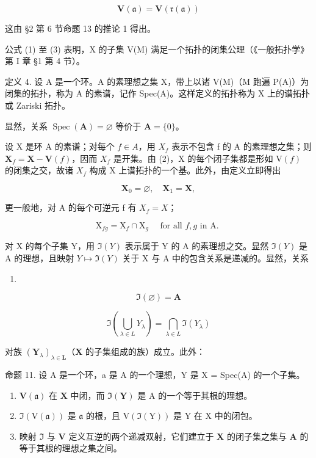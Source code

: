 \[
\mathbf {V} (\mathfrak {a}) = \mathbf {V} (\mathfrak {r} (\mathfrak {a}))\tag{4}
\]

这由 §2 第 6 节命题 13 的推论 1 得出。

公式 (1) 至 (3) 表明，X 的子集 V(M) 满足一个拓扑的闭集公理（《一般拓扑学》第 I 章 §1 第 4 节）。

定义 4. 设 A 是一个环。A 的素理想之集 X，带上以诸 V(M)（M 跑遍 P(A)）为闭集的拓扑，称为 A 的素谱，记作 Spec(A)。这样定义的拓扑称为 X 上的谱拓扑或 Zariski 拓扑。

显然，关系 \(\operatorname{Spec}(\mathbf{A}) = \varnothing\) 等价于 \(\mathbf{A} = \{0\}\)。

设 X 是环 A 的素谱；对每个 \(f \in A\)，用 \(X_{f}\) 表示不包含 f 的 A 的素理想之集；则 \(\mathbf{X}_{f} = \mathbf{X} - \mathbf{V}(f)\)，因而 \(X_{f}\) 是开集。由 (2)，X 的每个闭子集都是形如 \(\mathrm{V}(f)\) 的闭集之交，故诸 \(X_{f}\) 构成 X 上谱拓扑的一个基。此外，由定义立即得出

\[
\mathbf {X} _ {0} = \varnothing , \quad \mathbf {X} _ {1} = \mathbf {X},\tag{5}
\]

更一般地，对 A 的每个可逆元 f 有 \(X_{f} = X\)；

\[
\mathrm{X} _ {f g} = \mathrm{X} _ {f} \cap \mathrm{X} _ {g} \quad \text {   for   all   } f, g \text {   in   A.   }\tag{6}
\]

对 X 的每个子集 Y，用 \(\Im(Y)\) 表示属于 Y 的 A 的素理想之交。显然 \(\Im(Y)\) 是 A 的理想，且映射 \(Y \mapsto \Im(Y)\) 关于 X 与 A 中的包含关系是递减的。显然，关系

\begin{enumerate}
\def\labelenumi{(\arabic{enumi})}
\setcounter{enumi}{6}
\tightlist
\item
\end{enumerate}

\[
\Im (\varnothing) = \mathbf {A}\tag{7}
\]

\[
\Im \left(\bigcup_ {\lambda \in L} Y _ {\lambda}\right) = \bigcap_ {\lambda \in L} \Im (Y _ {\lambda})\tag{8}
\]

对族 \((\mathbf{Y}_{\lambda})_{\lambda \in \mathbf{L}}\)（\(\mathbf{X}\) 的子集组成的族）成立。此外：

命题 11. 设 A 是一个环，a 是 A 的一个理想，Y 是 X = Spec(A) 的一个子集。

\begin{enumerate}
\def\labelenumi{(\roman{enumi})}
\item
  \(\mathbf{V}(\mathfrak{a})\) 在 \(\mathbf{X}\) 中闭，而 \(\Im (\mathbf{Y})\) 是 A 的一个等于其根的理想。
\item
  \(\Im(\mathrm{V}(\mathfrak{a}))\) 是 \(\mathfrak{a}\) 的根，且 \(\mathrm{V}(\Im(\mathrm{Y}))\) 是 \(\mathrm{Y}\) 在 \(\mathrm{X}\) 中的闭包。
\item
  映射 \(\Im\) 与 \(\mathbf{V}\) 定义互逆的两个递减双射，它们建立于 \(\mathbf{X}\) 的闭子集之集与 \(\mathbf{A}\) 的等于其根的理想之集之间。
\end{enumerate}

